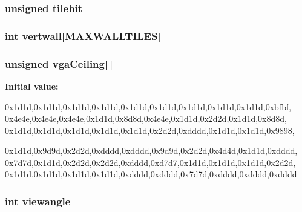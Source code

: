 \label{WL__DRAW_8C_ab864b51e17df4138d9cb8e5549825c3f}
\hypertarget{WL__DRAW_8C_a78da4a34948ae93be71fddfc652c5690}{
\subsubsection[{tilehit}]{\setlength{\rightskip}{0pt plus 5cm}unsigned {\bf tilehit}}}
\label{WL__DRAW_8C_a78da4a34948ae93be71fddfc652c5690}
\hypertarget{WL__DRAW_8C_a547c957a9b11d3cdf23e669f0ca0bbdc}{
\subsubsection[{vertwall}]{\setlength{\rightskip}{0pt plus 5cm}int {\bf vertwall}\mbox{[}MAXWALLTILES\mbox{]}}}
\label{WL__DRAW_8C_a547c957a9b11d3cdf23e669f0ca0bbdc}
\hypertarget{WL__DRAW_8C_a4bac1032a2c87cdff1512670555bc698}{
\subsubsection[{vgaCeiling}]{\setlength{\rightskip}{0pt plus 5cm}unsigned {\bf vgaCeiling}\mbox{[}$\,$\mbox{]}}}
\label{WL__DRAW_8C_a4bac1032a2c87cdff1512670555bc698}
{\bfseries Initial value:}
\begin{DoxyCode}

{

 0x1d1d,0x1d1d,0x1d1d,0x1d1d,0x1d1d,0x1d1d,0x1d1d,0x1d1d,0x1d1d,0xbfbf,
 0x4e4e,0x4e4e,0x4e4e,0x1d1d,0x8d8d,0x4e4e,0x1d1d,0x2d2d,0x1d1d,0x8d8d,
 0x1d1d,0x1d1d,0x1d1d,0x1d1d,0x1d1d,0x2d2d,0xdddd,0x1d1d,0x1d1d,0x9898,

 0x1d1d,0x9d9d,0x2d2d,0xdddd,0xdddd,0x9d9d,0x2d2d,0x4d4d,0x1d1d,0xdddd,
 0x7d7d,0x1d1d,0x2d2d,0x2d2d,0xdddd,0xd7d7,0x1d1d,0x1d1d,0x1d1d,0x2d2d,
 0x1d1d,0x1d1d,0x1d1d,0x1d1d,0xdddd,0xdddd,0x7d7d,0xdddd,0xdddd,0xdddd




}
\end{DoxyCode}
\hypertarget{WL__DRAW_8C_a3018b2f6c2d45eb33e8c894301d545df}{
\subsubsection[{viewangle}]{\setlength{\rightskip}{0pt plus 5cm}int {\bf viewangle}}}
